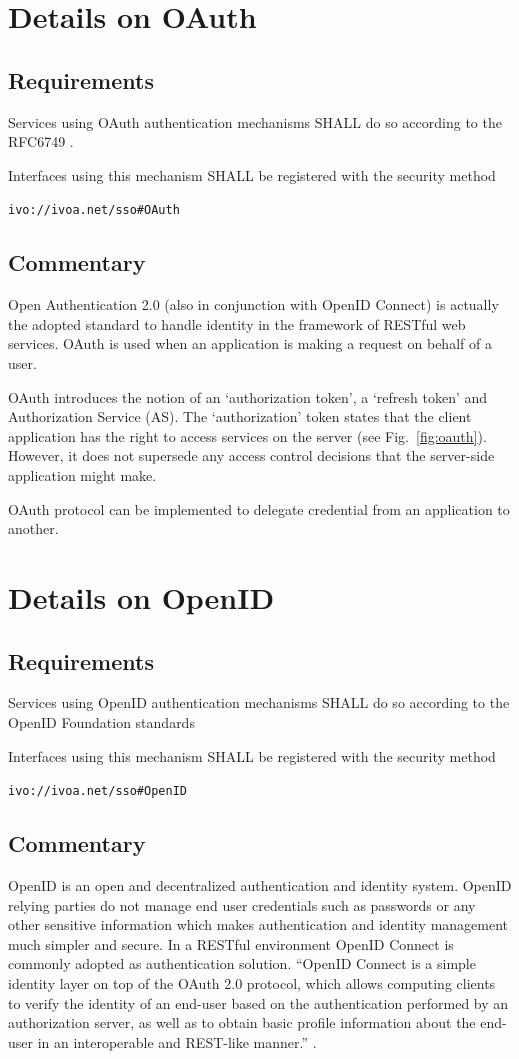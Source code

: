 \documentclass[11pt,a4paper]{ivoa}
\begin{document}
\section{Details on OAuth}
\subsection{Requirements}
Services using OAuth authentication mechanisms SHALL do so according to the RFC6749 \citep{std:RFC6749}.

Interfaces using this mechanism SHALL  be registered with the security method 

\texttt{ivo://ivoa.net/sso\#OAuth}


\subsection{Commentary}
Open Authentication 2.0 (also in conjunction with OpenID Connect) is actually the adopted standard 
to handle identity in the framework of RESTful web services. 
OAuth is used when an application is making a request on behalf of a user.

OAuth introduces the notion of an `authorization token', a `refresh token' and Authorization Service (AS). 
The `authorization' token states that the client application has the right to access services on the server  (see Fig.~\ref{fig:oauth}). 
However, it does not supersede any access control decisions that the server-side application might make.

OAuth protocol can be implemented  to delegate credential from an application to another.

\section{Details on OpenID}
\subsection{Requirements}
Services using OpenID authentication mechanisms SHALL do so according to the OpenID Foundation standards \citep{std:openid}
  
Interfaces using this mechanism SHALL  be registered with the security method 

\texttt{ivo://ivoa.net/sso\#OpenID}

  
\subsection{Commentary}
OpenID is an open and decentralized authentication and identity system. OpenID relying parties do not manage end user credentials 
such as passwords or any other sensitive information which makes authentication and identity management much simpler and secure.
In a RESTful environment OpenID Connect \citep{std:openidconnect} is commonly adopted as authentication solution. ``OpenID Connect  is a simple identity 
layer on top of the OAuth 2.0 protocol, which allows computing clients to verify the identity of an end-user based on the authentication
 performed by an authorization server, as well as to obtain basic profile information about the end-user in an interoperable and REST-like manner.'' \citep{std:openid}.
  
\end{document}
